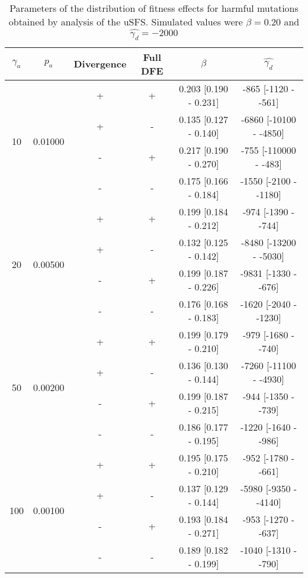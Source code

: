 
\begin{table}
   \centering
   \begin{threeparttable}[b]
\caption{Parameters of the distribution of fitness effects for harmful mutations obtained by analysis of the uSFS. Simulated values were $\beta = 0.20$ and $\hat{\gamma_d} = -2000$  }

\begin{tabular}{cccccc}
\toprule
$\gamma_a$ & $p_a$ & Divergence\tnote{a} & Full DFE\tnote{b} & $\beta$\tnote{c} & $\hat{\gamma_d}$ \tnote{d} \\
\midrule
 \multirow{4}{*}{10}&\multirow{4}{*}{0.01000}&        + &        + &  0.203 [0.190 - 0.231] &  -865 [-1120 -  -561] \\
 &&        + &        - &  0.135 [0.127 - 0.140] & -6860 [-10100 -  -4850] \\
 &&        - &        + &  0.217 [0.190 - 0.270] &  -755 [-110000 -  -483] \\
 &&        - &        - &  0.175 [0.166 - 0.184] & -1550 [-2100 -  -1180] \\ \hline
 \multirow{4}{*}{20}&\multirow{4}{*}{0.00500}&        + &        + &  0.199 [0.184 - 0.212] &  -974 [-1390 -  -744] \\
 &&        + &        - &  0.132 [0.125 - 0.142] & -8480 [-13200 -  -5030] \\
 &&        - &        + &  0.199 [0.187 - 0.226] & -9831 [-1330 -  -676] \\
 &&        - &        - &  0.176 [0.168 - 0.183] & -1620 [-2040 -  -1230] \\ \hline
 \multirow{4}{*}{50}&\multirow{4}{*}{0.00200}&        + &        + &  0.199 [0.179 - 0.210] &  -979 [-1680 -  -740] \\
 &&        + &        - &  0.136 [0.130 - 0.144] & -7260 [-11100 -  -4930] \\
 &&        - &        + &  0.199 [0.187 - 0.215] &  -944 [-1350 -  -739] \\
   &&      - &        - &  0.186 [0.177 - 0.195] & -1220 [-1640 -  -986] \\ \hline
      \multirow{4}{*}{100}&\multirow{4}{*}{0.00100}&   + &        + &  0.195 [0.175 - 0.210] &  -952 [-1780 -  -661] \\
       &&  + &        - &  0.137 [0.129 - 0.144] & -5980 [-9350 -  -4140] \\
         &&- &        + &  0.193 [0.184 - 0.271] &  -953 [-1270 -  -637] \\
&&         - &        - &  0.189 [0.182 - 0.199] & -1040 [-1310 -  -790] \\ \hline

\end{tabular}
\end{threeparttable}
\end{table}
